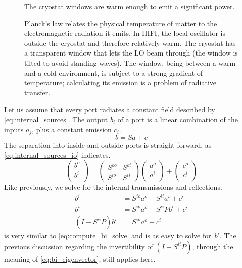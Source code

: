 \begin{figure}[hbtp]
    \centering
    
    \caption{The cryostat windows are warm enough to emit a significant power.}
    \caption*{
        Planck's law relates the physical temperature of matter to the electromagnetic radiation it emits.
        In HIFI, the local oscillator is outside the cryostat and therefore relatively warm.
        The cryostat has a transparent window that lets the LO beam through (the window is tilted to avoid standing waves).
        The window, being between a warm and a cold environment, is subject to a strong gradient of temperature; calculating its emission is a problem of radiative transfer.}
    \label{fig:internal_sources_windows} 
\end{figure}

Let us assume that every port radiates a constant field described by \cref{eq:internal_sources}.
The output $b_i$ of a port is a linear combination of the inputs $a_j$, plus a constant emission $c_i$.
\begin{equation}
    b = S a + c
    \label{eq:internal_sources}
\end{equation}
The separation into inside and outside ports is straight forward, as \cref{eq:internal_sources_io} indicates.
\begin{equation}
    \begin{pmatrix}
        b^o\\
        b^i\\
    \end{pmatrix}
    =
    \begin{pmatrix}
        S^{oo} & S^{oi} \\
        S^{io} & S^{ii}
    \end{pmatrix}
    \begin{pmatrix}
        a^o\\
        a^i\\
    \end{pmatrix}
    +
    \begin{pmatrix}
        c^o\\
        c^i\\
    \end{pmatrix}
    \label{eq:internal_sources_io}
\end{equation}
Like previously, we solve for the internal transmissions and reflections.
\begin{subequations}
    \begin{align}
        b^i &= S^{io} a^o + S^{ii} a^i + c^i \label{eq:compute_bi_ai_ci}\\
        b^i &= S^{io} a^o + S^{ii} Pb^i + c^i \label{eq:compute_bi_bi_ci}\\
        (I - S^{ii} P) b^i &= S^{io} a^o + c^i \label{eq:compute_bi_ci_solve}
    \end{align}
    \label{eq:compute_bi_ci}
\end{subequations}
 is very similar to \cref{eq:compute_bi_solve} and is as easy to solve for~$b^i$.
The previous discussion regarding the invertibility of $(I - S^{ii} P)$, through the meaning of \cref{eq:bi_eigenvector}, still applies here.


